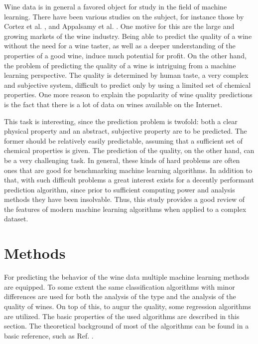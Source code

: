 \documentclass[twoside]{article}
\begin{document}
\begin{multicols}{2}
Wine data is in general a favored object for study in the field of machine learning. There have been various studies
on the subject, for instance those by Cortez et al. \cite{WQA}, \cite{CorCer09} 
and Appalsamy et al. \cite{Appalsami}. One motive for this are the large and growing markets of the wine industry.
Being able to predict the quality of a wine without the need for a wine taster, as well as a deeper understanding
of the properties of a good wine, induce much potential for profit. On the other hand, the problem of predicting
the quality of a wine is intriguing from a machine learning perspective. The quality is determined by human taste,
a very complex and subjective system, difficult to predict only by using a limited set of chemical properties.
One more reason to explain the popularity of wine quality predictions is the fact that there is a lot of data
on wines available on the Internet.

This task is interesting, since the prediction problem is twofold: both a clear physical property and an abstract, subjective property
are to be predicted. The former should be relatively easily predictable, assuming that a sufficient set
of chemical properties is given. The prediction of the quality, on the other hand, can be a very challenging task.
In general, these kinds of hard problems are often ones that are good for benchmarking machine learning algorithms.
In addition to that, with such difficult problems a great interest exists for a decently performant prediction algorithm,
since prior to sufficient computing power and analysis methods they have been insolvable. Thus, this study provides a
good review of the features of modern machine learning algorithms when applied to a complex dataset.
 
\section{Methods}

For predicting the behavior of the wine data multiple machine learning methods are equipped.
To some extent the same classification algorithms with minor differences are used for both
the analysis of the type and the analysis of the quality of wines. On top of this, to augur the 
quality, some regression algorithms are utilized. The basic properties of the used algorithms
are described in this section. The theoretical background of most of the algorithms can be found
in a basic reference, such as Ref. \cite{Alpaydin}. 


\end{multicols}
\end{document}
